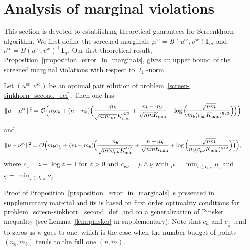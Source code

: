 
\section{Analysis of marginal violations} %
\label{sec:analysis_of_marginal_violations}

This section is devoted to establishing theoretical guarantees for Screenkhorn algorithm. %
We first define the screened marginals $\mu^{\text{sc}} = B(u^{\text{sc}}, v^{\text{sc}}) \mathbf 1_m$ and $\nu^{\text{sc}} = B(u^{\text{sc}}, v^{\text{sc}})^\top \mathbf 1_n.$ 
Our first theoretical result, Proposition~\ref{proposition_error_in_marginals}, gives an upper bound of the screened marginal violations with respect to $\ell_1$-norm.

\begin{proposition}
\label{proposition_error_in_marginals}
Let $(u^{\text{sc}}, v^{\text{sc}})$ be an optimal pair solution of problem~\eqref{screen-sinkhorn_second_def}.
Then one has 
\begin{align}
\label{marginal-error-mu}
{\|{\mu} -{\mu}^{\text{sc}}\|^2_1} = \mathcal{O}\Big(n_bc_\kappa + (n- n_b) \Big(\frac{m_b}{\sqrt{nmc_{\mu\nu}}K_{\min}^{3/2}} &+ \frac{m-m_b}{\sqrt{nm}K_{\min}}
 + \log\Big(\frac{\sqrt{nm}}{m_b(c_{\mu\nu}K_{\min})^{5/2}} 
\Big)\Big)\Big)
\end{align}
and 
\begin{align}
\label{marginal-error-nu}
{\|{\nu} -{\nu}^{\text{sc}}\|^2_1} = \mathcal{O}\Big(m_bc_{\frac1\kappa} + (m- m_b) \Big(\frac{n_b}{\sqrt{nmc_{\mu\nu}}K_{\min}^{3/2}} &+ \frac{n-n_b}{\sqrt{nm}K_{\min}}
 + \log\Big(\frac{\sqrt{nm}}{n_b (c_{\mu\nu}K_{\min})^{5/2}}
\Big)\Big)\Big),
\end{align}
where $c_z = z - \log z - 1$ for $z>0$ and $c_{\mu\nu} = \underline{\mu}\wedge \underline{\nu}$ with $\underline{\mu} = \min_{i\in I_{\varepsilon,\kappa}}\mu_i$ and $\underline{\nu} = \min_{j\in J_{\varepsilon,\kappa}}\nu_j$.

\end{proposition}
Proof of Proposition~\ref{proposition_error_in_marginals} is presented in supplementary material and its is based on first order optimality conditions for problem~\eqref{screen-sinkhorn_second_def} and on a generalization of Pinsker inequality (see Lemma~\ref{lem:pinsker} in supplementary).
Note that $c_\kappa$ and $c_{\frac 1\kappa}$ tend to zeros as $\kappa$ goes to one, which is the case when the number budget of points $(n_b,m_b)$ tends to the full one $(n,m)$.

